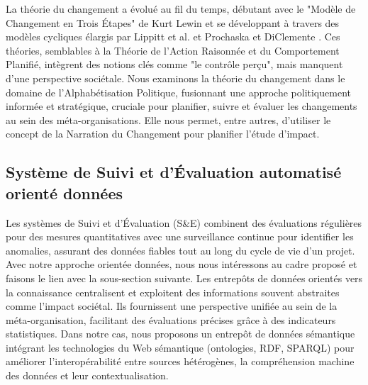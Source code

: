 La théorie du changement a évolué au fil du temps, débutant avec le "Modèle de Changement en Trois Étapes" de Kurt Lewin \cite{lewin_frontiers_1947} et se développant à travers des modèles cycliques élargis par Lippitt et al. \cite{lippitt_dynamics_1958} et Prochaska et DiClemente \cite{prochaska_stages_1983}. Ces théories, semblables à la Théorie de l’Action Raisonnée et du Comportement Planifié, intègrent des notions clés comme "le contrôle perçu", mais manquent d'une perspective sociétale. Nous examinons la théorie du changement dans le domaine de l'Alphabétisation Politique, fusionnant une approche politiquement informée et stratégique, cruciale pour planifier, suivre et évaluer les changements au sein des méta-organisations. Elle nous permet, entre autres, d'utiliser le concept de la Narration du Changement pour planifier l'étude d'impact.

\subsection{Système de Suivi et d'Évaluation automatisé orienté données}
Les systèmes de Suivi et d'Évaluation (S\&E) combinent des évaluations régulières pour des mesures quantitatives avec une surveillance continue pour identifier les anomalies, assurant des données fiables tout au long du cycle de vie d’un projet. Avec notre approche orientée données, nous nous intéressons au cadre proposé et faisons le lien avec la sous-section suivante.
Les entrepôts de données orientés vers la connaissance centralisent et exploitent des informations souvent abstraites comme l’impact sociétal. Ils fournissent une perspective unifiée au sein de la méta-organisation, facilitant des évaluations précises grâce à des indicateurs statistiques.
Dans notre cas, nous proposons un entrepôt de données sémantique intégrant les technologies du Web sémantique (ontologies, RDF, SPARQL) pour améliorer l’interopérabilité entre sources hétérogènes, la compréhension machine des données et leur contextualisation. 